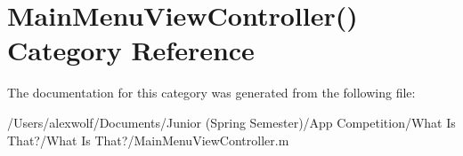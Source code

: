 \hypertarget{category_main_menu_view_controller_07_08}{\section{Main\-Menu\-View\-Controller() Category Reference}
\label{category_main_menu_view_controller_07_08}
}


The documentation for this category was generated from the following file\-:\begin{DoxyCompactItemize}
\item 
/\-Users/alexwolf/\-Documents/\-Junior (\-Spring Semester)/\-App Competition/\-What Is That?/\-What Is That?/Main\-Menu\-View\-Controller.\-m\end{DoxyCompactItemize}
